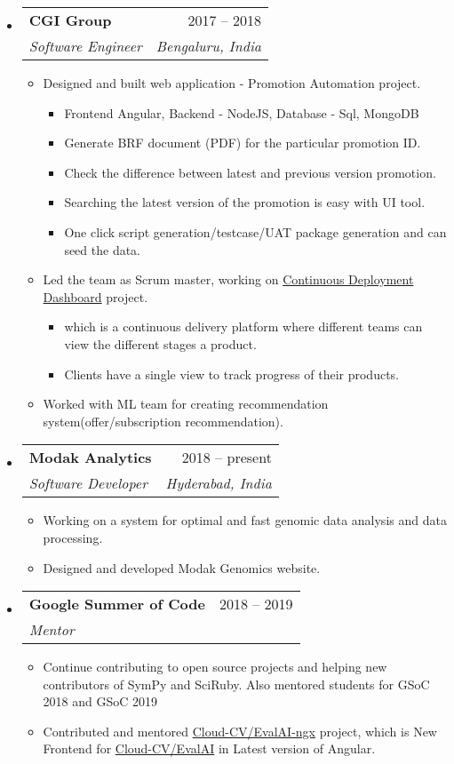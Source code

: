 \documentclass[letterpaper,12pt]{article}[leftmargin=*]
\makeatletter
\def \entryspacing {-0pt}
\newcommand{\resumeEntryStart}{\begin{itemize}[leftmargin=2.5mm]}
\newcommand{\resumeEntryEnd}{\end{itemize}\vspace{\entryspacing}}
\newcommand{\resumeItemListStart}{\begin{itemize}[leftmargin=4.5mm]}
\newcommand{\resumeItemListEnd}{\end{itemize}}
\newcommand{\resumeItem}[1]{
  \item\small{
    {#1 \vspace{-2pt}}
  }
}
\newcommand{\resumeEntryTSDL}[4]{
  \vspace{-1pt}\item[]
    \begin{tabular*}{0.97\textwidth}{l@{\extracolsep{\fill}}r}
      \textbf{\color{primary}#1} & {\firabook\color{accent}\small#2} \\
      \textit{\color{accent}\small#3} & \textit{\color{accent}\small#4} \\
    \end{tabular*}\vspace{-6pt}
}
\makeatother
\begin{document}
  \resumeEntryStart
    \resumeEntryTSDL
      {CGI Group}{ 2017 -- 2018}
      {Software Engineer}{Bengaluru, India}
    \resumeItemListStart
      \resumeItem {Designed and built web application - Promotion Automation project.}
      \begin{itemize}
         \item Frontend Angular, Backend - NodeJS, Database - Sql, MongoDB 
         \item Generate BRF document (PDF) for the particular promotion ID. 
         \item Check the difference between latest and previous version promotion.
         \item Searching the latest version of the promotion is easy with UI tool.
         \item One click script generation/testcase/UAT package generation and can seed the data.
       \end{itemize}
      \resumeItem {Led the team as Scrum master, working on \href{http://slides.com/shekharrajak/dd/}{Continuous Deployment Dashboard} project. }
      \begin{itemize}
          \item which is a continuous delivery platform where different teams can view the different stages a product.
          \item Clients have a single view to track progress of their products.
      \end{itemize}
      \resumeItem {Worked with ML team for creating recommendation system(offer/subscription recommendation).}
    \resumeItemListEnd
  \resumeEntryEnd
  
  \resumeEntryStart
    \resumeEntryTSDL
      {Modak Analytics}{2018 -- present}
      {Software Developer}{Hyderabad, India}
    \resumeItemListStart
      \resumeItem {Working on a system for optimal and fast genomic data analysis and
data processing.}
      \resumeItem {Designed and developed Modak Genomics website.}
    \resumeItemListEnd
  \resumeEntryEnd

  
  \resumeEntryStart
    \resumeEntryTSDL
      {Google Summer of Code}{2018 -- 2019}
      {Mentor}{}
    \resumeItemListStart
      \resumeItem {Continue contributing to open source projects and helping new contributors of SymPy and SciRuby. Also mentored students for GSoC 2018 and GSoC 2019}
      \resumeItem {Contributed and mentored \href{https://github.com/Cloud-CV/EvalAI-ngx}{Cloud-CV/EvalAI-ngx} project, which is New Frontend for \href{https://github.com/Cloud-CV/EvalAI}{Cloud-CV/EvalAI} in Latest version of Angular.}
    \resumeItemListEnd
  \resumeEntryEnd
\end{document}
